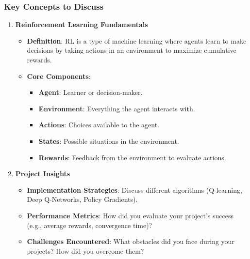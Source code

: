 \documentclass[aspectratio=169]{beamer}
\begin{document}
\begin{frame}[fragile]
    \frametitle{Key Concepts to Discuss}
    \begin{enumerate}
        \item \textbf{Reinforcement Learning Fundamentals}
        \begin{itemize}
            \item \textbf{Definition}: RL is a type of machine learning where agents learn to make decisions by taking actions in an environment to maximize cumulative rewards.
            \item \textbf{Core Components}:
            \begin{itemize}
                \item \textbf{Agent}: Learner or decision-maker.
                \item \textbf{Environment}: Everything the agent interacts with.
                \item \textbf{Actions}: Choices available to the agent.
                \item \textbf{States}: Possible situations in the environment.
                \item \textbf{Rewards}: Feedback from the environment to evaluate actions.
            \end{itemize}
        \end{itemize}
        
        \item \textbf{Project Insights}
        \begin{itemize}
            \item \textbf{Implementation Strategies}: Discuss different algorithms (Q-learning, Deep Q-Networks, Policy Gradients).
            \item \textbf{Performance Metrics}: How did you evaluate your project's success (e.g., average rewards, convergence time)?
            \item \textbf{Challenges Encountered}: What obstacles did you face during your projects? How did you overcome them?
        \end{itemize}
    \end{enumerate}
\end{frame}
\end{document}
